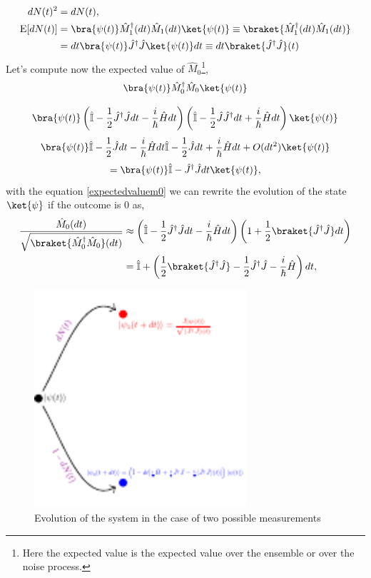 \begin{align}
dN(t)^{2}&=dN(t),\label{stochasticnumber}\\
\text{E}[dN(t)]&=\bra{\psi(t)}\hat{M}_{1}^{\dagger}(dt)\hat{M}_{1}(dt)\ket{\psi(t)}\equiv\braket{\hat{M}_{1}^{\dagger}(dt)\hat{M}_{1}(dt)}\nonumber\\
&=dt\bra{\psi(t)}\hat{J}^{\dagger}\hat{J}\ket{\psi(t)}dt\equiv dt\braket{\hat{J}^{\dagger}\hat{J}}(t)\label{expectedvaluedn}
\end{align} 
Let's compute now the expected value of $\hat{M}_0$\footnote{Here the expected value is the expected value over the ensemble or over the noise process.},
\[\bra{\psi(t)}\hat{M}_{0}^{\dagger}\hat{M}_{0}\ket{\psi(t)}\]

\[\bra{\psi(t)}\left(\hat{\mathbb{I}}-\frac{1}{2}\hat{J}^{\dagger}\hat{J}dt-\frac{i}{\hbar}\hat{H}dt\right)\left(\hat{\mathbb{I}}-\frac{1}{2}\hat{J}\hat{J}^{\dagger}dt+\frac{i}{\hbar}\hat{H}dt\right)\ket{\psi(t)}\]
\[\bra{\psi(t)}\hat{\mathbb{I}}-\frac{1}{2}\hat{J}dt-\frac{i}{\hbar}\hat{H}dt\hat{\mathbb{I}}-\frac{1}{2}\hat{J}dt+\frac{i}{\hbar}\hat{H}dt+O(dt^{2})\ket{\psi(t)}\]
\begin{equation}
=\bra{\psi(t)}\hat{\mathbb{I}}-\hat{J}^{\dagger}\hat{J}dt\ket{\psi(t)},
\label{expectedvaluem0}
\end{equation}
with the equation \eqref{expectedvaluem0} we can rewrite the evolution of the state $\ket{\psi}$ if the outcome is 0 as,
\begin{align}
\frac{\hat{M}_{0}(dt)}{\sqrt{\braket{\hat{M}_{0}^{\dagger}\hat{M}_{0}}(dt)}}&\approx\left(\hat{\mathbb{I}}-\frac{1}{2}\hat{J}^{\dagger}\hat{J}dt-\frac{i}{\hbar}\hat{H}dt\right)\left(1+\frac{1}{2}\braket{\hat{J}^{\dagger}\hat{J}}dt\right)\nonumber\\
&=\hat{\mathbb{I}}+\left(\frac{1}{2}\braket{\hat{J}^{\dagger}\hat{J}}-\frac{1}{2}\hat{J}^{\dagger}\hat{J}-\frac{i}{\hbar}\hat{H}\right)dt,
\label{trajectory5}
\end{align}
\begin{figure}[h!]
\centering
\includegraphics[width=0.7\textwidth]{Figures/equations.pdf}
\caption{Evolution of the system in the case of two possible measurements}
\label{Systemevolution}
\end{figure}  
